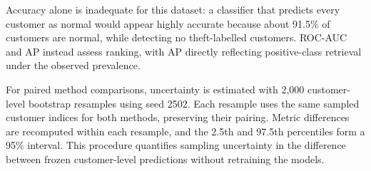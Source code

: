 Accuracy alone is inadequate for this dataset: a classifier that predicts every customer as normal would appear highly accurate because about 91.5\% of customers are normal, while detecting no theft-labelled customers. ROC-AUC and AP instead assess ranking, with AP directly reflecting positive-class retrieval under the observed prevalence.

For paired method comparisons, uncertainty is estimated with 2,000 customer-level bootstrap resamples using seed 2502. Each resample uses the same sampled customer indices for both methods, preserving their pairing. Metric differences are recomputed within each resample, and the 2.5th and 97.5th percentiles form a 95\% interval. This procedure quantifies sampling uncertainty in the difference between frozen customer-level predictions without retraining the models.
